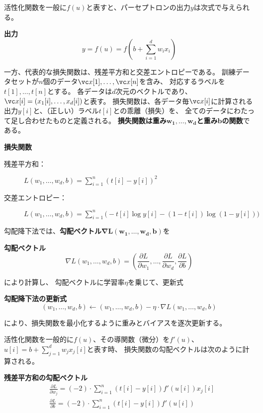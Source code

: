 活性化関数を一般に$f(u)$と表すと、パーセプトロンの出力$y$は次式で与えられる。
\begin{itembox}{\bf 出力}
  \[
    y = f(u) = f\left(b + \sum_{i=1}^d w_i x_i\right)
  \]
\end{itembox}

一方、代表的な損失関数は、残差平方和と交差エントロピーである。
訓練データセットが$n$個のデータ$\vc x[1], \dots, \vc x[n]$を含み、
対応するラベルを$t[1], \dots, t[n]$とする。
各データは$d$次元のベクトルであり、
$\vc x[i] = (x_1[i], \dots, x_d[i])$と表す。
損失関数は、各データ毎$\vc x[i]$に計算される出力$y[i]$と、（正しい）ラベル$t[i]$との乖離（損失）を、
全てのデータにわたって足し合わせたものと定義される。
\textbf{損失関数は重み$\boldsymbol{w_1, \dots, w_d}$と重み$\boldsymbol b$の関数}である。
\begin{itembox}{\bf 損失関数}
  \begin{description}
  \item[残差平方和：] $\displaystyle
    L(w_1, \dots, w_d, b) = \sum_{i=1}^n \left(t[i] - y[i]\right)^2$
  \item[交差エントロピー：] $\displaystyle
    L(w_1, \dots, w_d, b) = \sum_{i=1}^n
    \big(-t[i]\log y[i] - (1 - t[i])\log (1 - y[i])\big)$
  \end{description}
\end{itembox}

勾配降下法では、\textbf{勾配ベクトル$\boldsymbol{\nabla L(w_1, \dots, w_d, b)}$}を
\begin{itembox}{\bf 勾配ベクトル}
\[
  \nabla L(w_1, \dots, w_d, b) =
  \left(\frac{\partial L}{\partial w_1}, \dots, \frac{\partial L}{\partial w_d},
  \frac{\partial L}{\partial b}\right)
\]
\end{itembox}
により計算し、
勾配ベクトルに学習率$\eta$を乗じて、更新式
\begin{itembox}{\bf 勾配降下法の更新式}
\[
  (w_1, \dots, w_d, b) \leftarrow
  (w_1, \dots, w_d, b) - \eta \cdot \nabla L(w_1, \dots, w_d, b)
\]
\end{itembox}
により、損失関数を最小化するように重みとバイアスを逐次更新する。

活性化関数を一般的に$f(u)$、その導関数（微分）を$f'(u)$、
$\displaystyle u[i] = b + \sum_{j=1}^d w_j x_j[i]$と表す時、
損失関数の勾配ベクトルは次のように計算される。
\begin{itembox}{\bf 残差平方和の勾配ベクトル}
  \begin{align*}
    &
    \frac{\partial L}{\partial w_j} = (-2) \cdot \sum_{i=1}^n
    \left(t[i] - y[i]\right) f'(u[i]) x_j[i]
    \\&
    \frac{\partial L}{\partial b} = (-2) \cdot \sum_{i=1}^n
    \left(t[i] - y[i]\right) f'(u[i])
  \end{align*}
\end{itembox}

